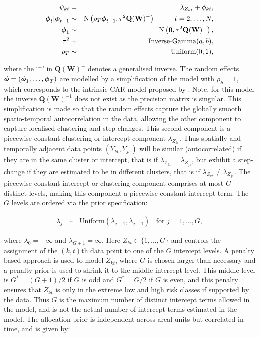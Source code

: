 \documentclass[article, nojss]{jss}
\newcommand{\bd}[1]{\ensuremath{\mbox{\boldmath $#1$}}}
\begin{document}
\begin{eqnarray}
\psi_{kt}&=&\lambda_{Z_{kt}} + \phi_{kt},\label{carcluster1}\\
\bd{\phi}_t|\bd{\phi}_{t-1} & \sim & \mbox{N}\left(\rho_T\bd{\phi}_{t-1}, \tau^{2} \mathbf{Q}(\mathbf{W})^{-}\right)\hspace{1cm} t=2,\ldots,N,\nonumber\\
\bd{\phi}_1 & \sim & \mbox{N}\left(\mathbf{0}, \tau^{2} \mathbf{Q}(\mathbf{W})^{-}\right),\nonumber\\
\tau^2&\sim&\mbox{Inverse-Gamma}(a,b),\nonumber\\
\rho_T&\sim&\mbox{Uniform}(0,1),\nonumber
\end{eqnarray}

where the `$^{-}$' in $\mathbf{Q}(\mathbf{W})^{-}$ denotes a generalised inverse. The random effects $\bd{\phi}=(\bd{\phi}_{1},\ldots,\bd{\phi}_{T})$ are modelled by a simplification of the  model with $\rho_S=1$, which corresponds to the intrinsic CAR model proposed by \cite{besag1991}. Note, for this model the inverse $\mathbf{Q}(\mathbf{W})^{-1}$ does not exist as the precision matrix is singular. This simplification is made so that the random effects capture the globally smooth spatio-temporal autocorrelation in the data, allowing the other component to capture localised clustering and step-changes. This second component is a piecewise constant clustering or intercept component $\lambda_{Z_{kt}}$. Thus spatially and  temporally adjacent data points $(Y_{kt}, Y_{js})$ will be similar (autocorrelated) if they are in the same cluster or intercept, that is if $\lambda_{Z_{kt}}=\lambda_{Z_{js}}$, but exhibit a step-change if they are estimated to be in different clusters, that is if $\lambda_{Z_{kt}}\neq\lambda_{Z_{js}}$. The piecewise constant intercept or clustering component  comprises at most $G$ distinct levels, making this component a piecewise constant intercept term. The $G$ levels are ordered via the prior specification:

\begin{eqnarray}
\lambda_{j}&\sim&\mbox{Uniform}(\lambda_{j-1},\lambda_{j+1})~~~~\mbox{for }j=1,\dots,G,\label{carcluster2}
\end{eqnarray}

where $\lambda_{0}=-\infty$ and  $\lambda_{G+1}=\infty$. Here $Z_{kt}\in\{1,\ldots,G\}$ and controls the assignment of the $(k,t)$th data point to one of the $G$ intercept levels. A penalty based approach is used to model $Z_{kt}$, where $G$ is chosen larger than necessary and a penalty prior is used  to shrink it to the middle intercept level.  This middle level is $G^{*}=(G+1)/2$ if $G$ is odd and $G^{*}=G/2$ if $G$ is even, and this penalty ensures that $Z_{kt}$ is only in the extreme low and high risk classes if supported by the data. Thus $G$ is the maximum number of distinct intercept terms allowed in the model, and is not the actual number of intercept terms estimated in the model. The allocation prior is independent across areal units but correlated in time, and is given by:
\end{document}
